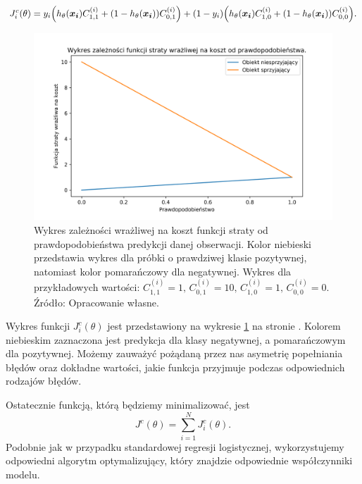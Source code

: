 \documentclass[inzynierska]{pwr_wmat_praca_dyplomowa}
\theoremstyle{plain}
\numberwithin{theorem}{chapter}
\theoremstyle{definition}
\numberwithin{theorem}{chapter}
\begin{document}
$$ J^c_i(\theta) = y_i \Big( h_{\theta}(\boldsymbol{x_i}) C^{(i)}_{1,1} + (1 - h_{\theta}(\boldsymbol{x_i}))C^{(i)}_{0,1} \Big) + (1-y_i) \Big( h_{\theta}(\boldsymbol{x_i}) C^{(i)}_{1,0} + (1 - h_{\theta}(\boldsymbol{x_i}))C^{(i)}_{0,0} \Big) \text{.} $$


\begin{figure}[h]
	\includegraphics[width=\linewidth]{images/cost_sensitive_ce.png}
	\caption{Wykres zależności wrażliwej na koszt funkcji straty od prawdopodobieństwa predykcji danej obserwacji. Kolor niebieski przedstawia wykres dla próbki o prawdziwej klasie pozytywnej, natomiast kolor pomarańczowy dla negatywnej. Wykres dla przykładowych wartości: $C^{(i)}_{1,1} = 1 \text{, } C^{(i)}_{0,1} = 10 \text{, } C^{(i)}_{1,0} = 1 \text{, } C^{(i)}_{0,0} = 0$. Źródło: Opracowanie własne.}
	\label{fig:cost-sensitive-loss-function}
\end{figure}

Wykres funkcji $J^c_i(\theta)$ jest przedstawiony na wykresie \ref{fig:cost-sensitive-loss-function} na stronie \pageref{fig:cost-sensitive-loss-function}. Kolorem niebieskim zaznaczona jest predykcja dla klasy negatywnej, a pomarańczowym dla pozytywnej. Możemy zauważyć pożądaną przez nas asymetrię popełniania błędów oraz dokładne wartości, jakie funkcja przyjmuje podczas odpowiednich rodzajów błędów.

Ostatecznie funkcją, którą będziemy minimalizować, jest 
$$ J^c(\theta) = \sum_{i=1}^{N} J^c_i(\theta) \text{.} $$
Podobnie jak w przypadku standardowej regresji logistycznej, wykorzystujemy odpowiedni algorytm optymalizujący, który znajdzie odpowiednie współczynniki modelu.
\end{document}

